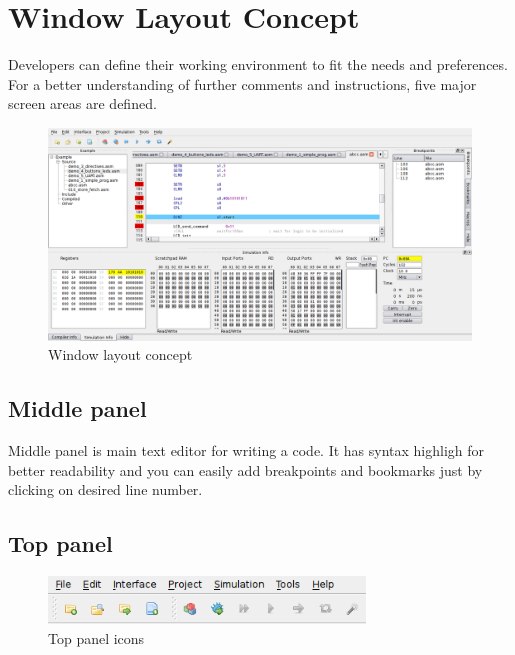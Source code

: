 \section{Window Layout Concept}
    Developers can define their working environment to fit the needs and preferences. For a better understanding of further comments and instructions, five major screen areas are defined. %


   \begin{figure}[h]
        \centering
        \includegraphics[width=\textwidth]{img/Main_window.png}
        \caption{Window layout concept}
    \end{figure}

\subsection{Middle panel}
    Middle panel is main text editor for writing a code. It has syntax highligh for better readability and you can easily
    add breakpoints and bookmarks just by clicking on desired line number.

\subsection{Top panel}

   \begin{figure}[h!]
        \centering
        \includegraphics[width=0.75\textwidth]{img/top_panel.png}
        \caption{Top panel icons}
    \end{figure}

